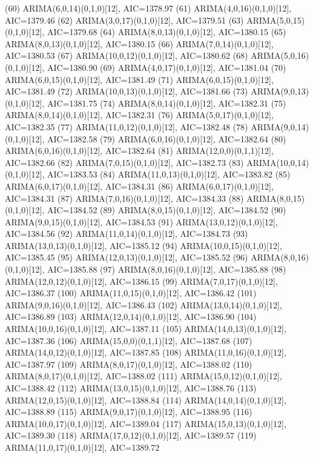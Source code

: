 \documentclass[12pt,letterpaper]{article}   %
\begin{document}
\begin{smallconsole}[caption={Modelos Ordenados por AIC}]
(60) ARIMA(6,0,14)(0,1,0)[12], AIC=1378.97
(61) ARIMA(4,0,16)(0,1,0)[12], AIC=1379.46
(62) ARIMA(3,0,17)(0,1,0)[12], AIC=1379.51
(63) ARIMA(5,0,15)(0,1,0)[12], AIC=1379.68
(64) ARIMA(8,0,13)(0,1,0)[12], AIC=1380.15
(65) ARIMA(8,0,13)(0,1,0)[12], AIC=1380.15
(66) ARIMA(7,0,14)(0,1,0)[12], AIC=1380.53
(67) ARIMA(10,0,12)(0,1,0)[12], AIC=1380.62
(68) ARIMA(5,0,16)(0,1,0)[12], AIC=1380.90
(69) ARIMA(4,0,17)(0,1,0)[12], AIC=1381.04
(70) ARIMA(6,0,15)(0,1,0)[12], AIC=1381.49
(71) ARIMA(6,0,15)(0,1,0)[12], AIC=1381.49
(72) ARIMA(10,0,13)(0,1,0)[12], AIC=1381.66
(73) ARIMA(9,0,13)(0,1,0)[12], AIC=1381.75
(74) ARIMA(8,0,14)(0,1,0)[12], AIC=1382.31
(75) ARIMA(8,0,14)(0,1,0)[12], AIC=1382.31
(76) ARIMA(5,0,17)(0,1,0)[12], AIC=1382.35
(77) ARIMA(11,0,12)(0,1,0)[12], AIC=1382.48
(78) ARIMA(9,0,14)(0,1,0)[12], AIC=1382.58
(79) ARIMA(6,0,16)(0,1,0)[12], AIC=1382.64
(80) ARIMA(6,0,16)(0,1,0)[12], AIC=1382.64
(81) ARIMA(12,0,0)(0,1,1)[12], AIC=1382.66
(82) ARIMA(7,0,15)(0,1,0)[12], AIC=1382.73
(83) ARIMA(10,0,14)(0,1,0)[12], AIC=1383.53
(84) ARIMA(11,0,13)(0,1,0)[12], AIC=1383.82
(85) ARIMA(6,0,17)(0,1,0)[12], AIC=1384.31
(86) ARIMA(6,0,17)(0,1,0)[12], AIC=1384.31
(87) ARIMA(7,0,16)(0,1,0)[12], AIC=1384.33
(88) ARIMA(8,0,15)(0,1,0)[12], AIC=1384.52
(89) ARIMA(8,0,15)(0,1,0)[12], AIC=1384.52
(90) ARIMA(9,0,15)(0,1,0)[12], AIC=1384.53
(91) ARIMA(13,0,12)(0,1,0)[12], AIC=1384.56
(92) ARIMA(11,0,14)(0,1,0)[12], AIC=1384.73
(93) ARIMA(13,0,13)(0,1,0)[12], AIC=1385.12
(94) ARIMA(10,0,15)(0,1,0)[12], AIC=1385.45
(95) ARIMA(12,0,13)(0,1,0)[12], AIC=1385.52
(96) ARIMA(8,0,16)(0,1,0)[12], AIC=1385.88
(97) ARIMA(8,0,16)(0,1,0)[12], AIC=1385.88
(98) ARIMA(12,0,12)(0,1,0)[12], AIC=1386.15
(99) ARIMA(7,0,17)(0,1,0)[12], AIC=1386.37
(100) ARIMA(11,0,15)(0,1,0)[12], AIC=1386.42
(101) ARIMA(9,0,16)(0,1,0)[12], AIC=1386.43
(102) ARIMA(13,0,14)(0,1,0)[12], AIC=1386.89
(103) ARIMA(12,0,14)(0,1,0)[12], AIC=1386.90
(104) ARIMA(10,0,16)(0,1,0)[12], AIC=1387.11
(105) ARIMA(14,0,13)(0,1,0)[12], AIC=1387.36
(106) ARIMA(15,0,0)(0,1,1)[12], AIC=1387.68
(107) ARIMA(14,0,12)(0,1,0)[12], AIC=1387.85
(108) ARIMA(11,0,16)(0,1,0)[12], AIC=1387.97
(109) ARIMA(8,0,17)(0,1,0)[12], AIC=1388.02
(110) ARIMA(8,0,17)(0,1,0)[12], AIC=1388.02
(111) ARIMA(15,0,12)(0,1,0)[12], AIC=1388.42
(112) ARIMA(13,0,15)(0,1,0)[12], AIC=1388.76
(113) ARIMA(12,0,15)(0,1,0)[12], AIC=1388.84
(114) ARIMA(14,0,14)(0,1,0)[12], AIC=1388.89
(115) ARIMA(9,0,17)(0,1,0)[12], AIC=1388.95
(116) ARIMA(10,0,17)(0,1,0)[12], AIC=1389.04
(117) ARIMA(15,0,13)(0,1,0)[12], AIC=1389.30
(118) ARIMA(17,0,12)(0,1,0)[12], AIC=1389.57
(119) ARIMA(11,0,17)(0,1,0)[12], AIC=1389.72

\end{smallconsole}
\end{document}
